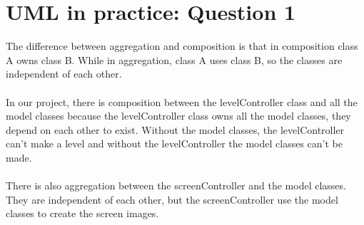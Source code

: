 \chapter{UML in practice: Question 1}

The difference between aggregation and composition is that in composition class A owns class B. While in aggregation, class A uses class B, so the classes are independent of each other. 
\\\\
In our project, there is composition between the levelController class and all the model classes because the levelController class owns all the model classes, they depend on each other to exist. Without the model classes, the levelController can't make a level and without the levelController the model classes can't be made. 
\\\\
There is also aggregation between the screenController and the model classes. They are independent of each other, but the screenController use the model classes to create the screen images. 